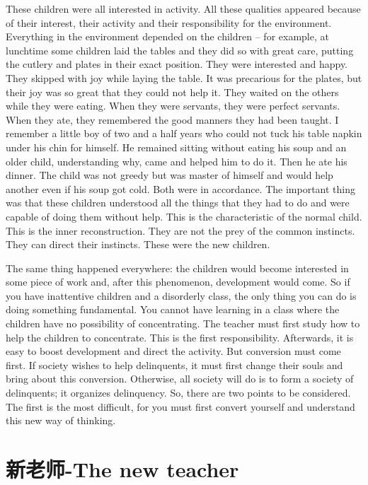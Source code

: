 \documentclass[lang=cn,10pt]{elegantbook}
\begin{document}
These children were all interested in activity. All these qualities
appeared because of their interest, their activity and their
responsibility for the environment. Everything in the environment
depended on the children – for example, at lunchtime some children
laid the tables and they did so with great care, putting the cutlery and
plates in their exact position. They were interested and happy. They
skipped with joy while laying the table. It was precarious for the
plates, but their joy was so great that they could not help it. They
waited on the others while they were eating. When they were
servants, they were perfect servants. When they ate, they
remembered the good manners they had been taught. I remember a
little boy of two and a half years who could not tuck his table napkin
under his chin for himself. He remained sitting without eating his
soup and an older child, understanding why, came and helped him to
do it. Then he ate his dinner. The child was not greedy but was
master of himself and would help another even if his soup got cold.
Both were in accordance. The important thing was that these
children understood all the things that they had to do and were
capable of doing them without help. This is the characteristic of the
normal child. This is the inner reconstruction. They are not the prey
of the common instincts. They can direct their instincts. These were
the new children.

The same thing happened everywhere: the children would
become interested in some piece of work and, after this
phenomenon, development would come. So if you have inattentive
children and a disorderly class, the only thing you can do is doing
something fundamental. You cannot have learning in a class where
the children have no possibility of concentrating. The teacher must
first study how to help the children to concentrate. This is the first
responsibility. Afterwards, it is easy to boost development and direct
the activity. But conversion must come first. If society wishes to help
delinquents, it must first change their souls and bring about this
conversion. Otherwise, all society will do is to form a society of
delinquents; it organizes delinquency. So, there are two points to be
considered. The first is the most difficult, for you must first convert
yourself and understand this new way of thinking.

\chapter{新老师-The new teacher}
\end{document}
